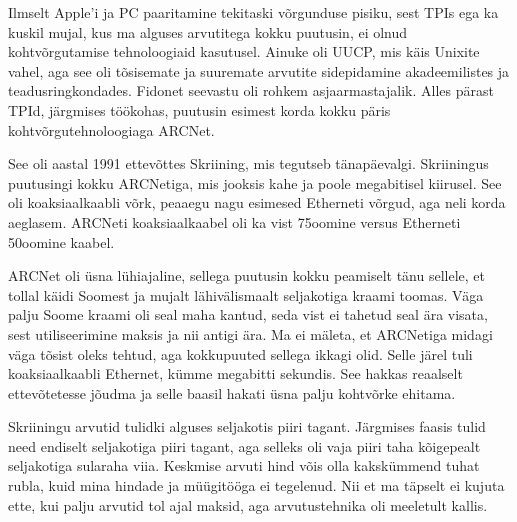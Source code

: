 
Ilmselt Apple'i ja PC paaritamine tekitaski võrgunduse 
pisiku, sest TPIs ega ka kuskil mujal, kus ma alguses arvutitega kokku 
puutusin, ei olnud kohtvõrgutamise tehnoloogiaid 
kasutusel. Ainuke oli UUCP, mis käis Unixite vahel, aga see oli 
tõsisemate ja suuremate arvutite sidepidamine akadeemilistes ja teadusringkondades. Fidonet seevastu oli 
rohkem asjaarmastajalik. Alles pärast TPId, järgmises töökohas, puutusin esimest 
korda kokku päris kohtvõrgutehnoloogiaga ARCNet.


See oli aastal 1991 ettevõttes Skriining, mis 
tegutseb tänapäevalgi. Skriiningus puutusingi kokku ARCNetiga, mis jooksis 
kahe ja poole megabitisel kiirusel. See oli koaksiaalkaabli võrk, 
peaaegu nagu esimesed Etherneti võrgud, aga neli korda aeglasem. ARCNeti koaksiaalkaabel oli ka vist 75oomine versus Etherneti 50oomine kaabel. 

ARCNet oli üsna lühiajaline, sellega puutusin kokku peamiselt 
tänu sellele, et tollal käidi Soomest ja mujalt lähivälismaalt 
seljakotiga kraami toomas. Väga palju Soome kraami oli 
seal maha kantud, seda vist ei tahetud seal ära visata, 
sest utiliseerimine maksis ja nii antigi ära. Ma ei mäleta, et ARCNetiga midagi väga tõsist oleks tehtud, aga 
kokkupuuted sellega ikkagi olid. Selle järel tuli koaksiaalkaabli Ethernet, kümme megabitti sekundis. See hakkas reaalselt ettevõtetesse jõudma ja selle baasil 
hakati üsna palju kohtvõrke ehitama.


Skriiningu arvutid tulidki alguses seljakotis piiri tagant. Järgmises faasis tulid need endiselt seljakotiga piiri tagant, aga 
selleks oli vaja piiri taha kõigepealt seljakotiga 
sularaha viia. Keskmise arvuti hind võis olla kakskümmend tuhat rubla, kuid mina hindade ja müügitööga ei tegelenud. Nii et ma täpselt ei kujuta ette, kui palju arvutid tol 
ajal maksid, aga arvutustehnika oli meeletult kallis.


